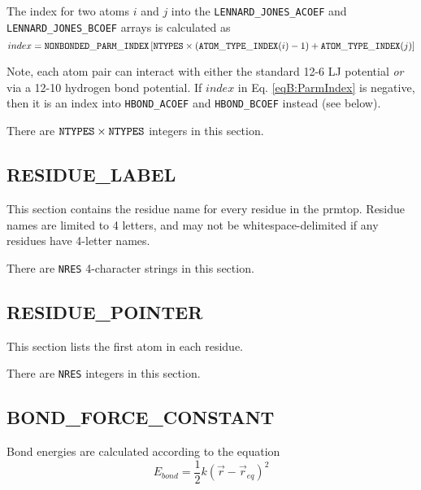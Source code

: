The index for two atoms $i$ and $j$ into the {\tt LENNARD\_JONES\_ACOEF} and
{\tt LENNARD\_JONES\_BCOEF} arrays is calculated as 
\begin{equation}
   index = {\tt NONBONDED\_PARM\_INDEX} \left [ {\tt NTYPES} \times \left ( {\tt
      ATOM\_TYPE\_INDEX}(i) - 1 \right ) + {\tt ATOM\_TYPE\_INDEX}(j) \right ]
   \label{eqB:ParmIndex}
\end{equation}

Note, each atom pair can interact with either the standard 12-6 LJ potential
\emph{or} via a 12-10 hydrogen bond potential. If $index$ in Eq.
\ref{eqB:ParmIndex} is negative, then it is an index into {\tt HBOND\_ACOEF} and
{\tt HBOND\_BCOEF} instead (see below).


\noindent There are ${\tt NTYPES} \times {\tt NTYPES}$ integers in this section.

\subsection*{RESIDUE\_LABEL}

This section contains the residue name for every residue in the prmtop. Residue
names are limited to 4 letters, and may not be whitespace-delimited if any
residues have 4-letter names.


\noindent There are {\tt NRES} 4-character strings in this section.

\subsection*{RESIDUE\_POINTER}

This section lists the first atom in each residue.


\noindent There are {\tt NRES} integers in this section.

\subsection*{BOND\_FORCE\_CONSTANT}

Bond energies are calculated according to the equation
\begin{equation}
   E_{bond} = \frac 1 2 k \left ( \vec{r} - \vec{r}_{eq} \right ) ^ 2
   \label{eqB:Bond}
\end{equation}

